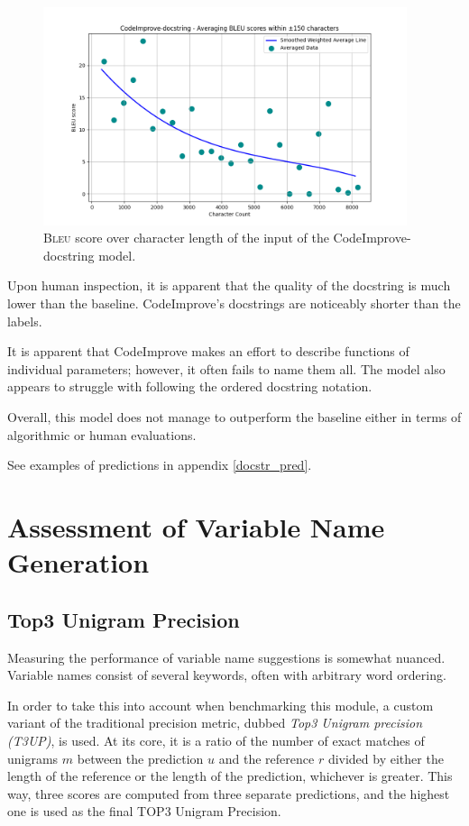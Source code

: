     \begin{figure}[H]
      \centering
      \includegraphics[width=0.95\textwidth]{obrazky-figures/Ncodeimprove-docstring.png}
       \caption{\textsc{Bleu} score over character length of the input of the CodeImprove-docstring model.}
      \label{fig:docstring_length_codeimporove}
    \end{figure}
    
    Upon human inspection, it is apparent that the quality of the docstring is much lower than the baseline. CodeImprove's docstrings are noticeably shorter than the labels.

    It is apparent that CodeImprove makes an effort to describe functions of individual parameters; however, it often fails to name them all. The model also appears to struggle with following the ordered docstring notation.

    Overall, this model does not manage to outperform the baseline either in terms of algorithmic or human evaluations.

    See examples of predictions in appendix \ref{docstr_pred}.
    
    \section{Assessment of Variable Name Generation}
    \subsection{Top3 Unigram Precision}
        Measuring the performance of variable name suggestions is somewhat nuanced. Variable names consist of several keywords, often with arbitrary word ordering.
    
        In order to take this into account when benchmarking this module, a custom variant of the traditional precision metric, dubbed \emph{Top3 Unigram precision (T3UP)}, is used. At its core, it is a ratio of the number of exact matches of unigrams $m$ between the prediction $u$ and the reference $r$ divided by either the length of the reference or the length of the prediction, whichever is greater. This way, three scores are computed from three separate predictions, and the highest one is used as the final TOP3 Unigram Precision.
        
